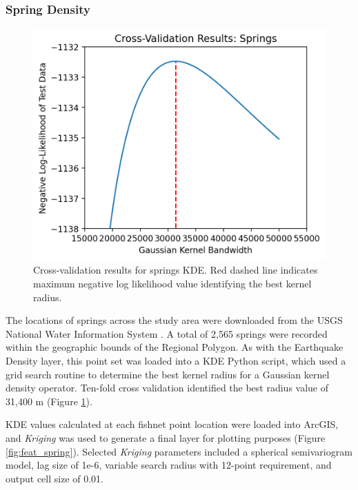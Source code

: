\subsubsection{Spring Density}
\begin{figure}
\centering
\includegraphics[scale=0.6]{templates/images/Figure-Springs_kde_gridsearchcv_result.png}
\singlespacing
\caption[Spring density parameter tuning]{Cross-validation results for springs KDE. Red dashed line indicates maximum negative log likelihood value identifying the best kernel radius.}
\label{fig:spring_cv}
\end{figure}
The locations of springs across the study area were downloaded from the USGS National Water Information System \citep{usgs_national_2021}. A total of 2,565 springs were recorded within the geographic bounds of the Regional Polygon. As with the Earthquake Density layer, this point set was loaded into a KDE Python script, which used a grid search routine to determine the best kernel radius for a Gaussian kernel density operator. Ten-fold cross validation identified the best radius value of 31,400 m (Figure \ref{fig:spring_cv}). 

KDE values calculated at each fishnet point location were loaded into ArcGIS, and \textit{Kriging} was used to generate a final layer for plotting purposes (Figure \ref{fig:feat_spring}). Selected \textit{Kriging} parameters included a spherical semivariogram model, lag size of 1e-6, variable search radius with 12-point requirement, and output cell size of 0.01. 

